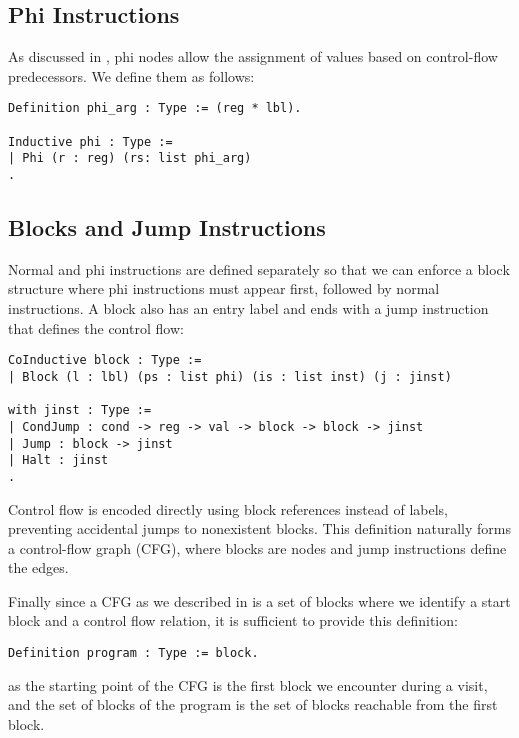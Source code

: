 \subsection{Phi Instructions}

As discussed in , phi nodes allow the assignment of values based on control-flow predecessors. We define them as follows:

\begin{lstlisting}[language=Coq]
Definition phi_arg : Type := (reg * lbl).

Inductive phi : Type :=
| Phi (r : reg) (rs: list phi_arg)
.
\end{lstlisting}


\subsection{Blocks and Jump Instructions}

Normal and phi instructions are defined separately so that we can enforce a block structure where phi instructions must appear first, followed by normal instructions. A block also has an entry label and ends with a jump instruction that defines the control flow:

\begin{lstlisting}[language=Coq]
CoInductive block : Type :=
| Block (l : lbl) (ps : list phi) (is : list inst) (j : jinst)

with jinst : Type :=
| CondJump : cond -> reg -> val -> block -> block -> jinst
| Jump : block -> jinst
| Halt : jinst
.
\end{lstlisting}

Control flow is encoded directly using block references instead of labels, preventing accidental jumps to nonexistent blocks. This definition naturally forms a control-flow graph (CFG), where blocks are nodes and jump instructions define the edges.

Finally since a CFG as we described in  is a set of blocks where we identify a start block and a control flow relation, it is sufficient to provide this definition:

\begin{lstlisting}[language=Coq]
Definition program : Type := block.
\end{lstlisting} as the starting point of the CFG is the first block we encounter during a visit, and the set of blocks of the program is the set of blocks reachable from the first block.


